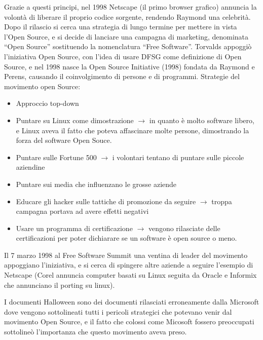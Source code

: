 Grazie a questi principi, nel 1998 Netscape (il primo browser grafico) annuncia la volont\`a di liberare il proprio codice sorgente, rendendo Raymond una celebrit\`a. Dopo il rilascio si cerca una strategia di lungo termine per mettere in vista l'Open Source, e si decide di lanciare una campagna di marketing, denominata ``Open Source'' sostituendo la nomenclatura ``Free Software''. Torvalds appoggi\`o l'iniziativa Open Source, con l'idea di usare DFSG come definizione di Open Source, e nel 1998 nasce la Open Source Initiative (1998) fondata da Raymond e Perens, causando il coinvolgimento di persone e di programmi. Strategie del movimento open Source:
\begin{itemize}

\item Approccio top-down
\item Puntare su Linux come dimostrazione $\to$ in quanto \`e molto software libero, e Linux aveva il fatto che poteva affascinare molte persone, dimostrando la forza del software Open Souce.
\item Puntare sulle Fortune 500 $\to$ i volontari tentano di puntare sulle piccole aziendine
\item Puntare sui media che influenzano le grosse aziende
\item Educare gli hacker sulle tattiche di promozione da seguire $\to$ troppa campagna portava ad avere effetti negativi
\item Usare un programma di certificazione $\to$ vengono rilasciate delle certificazioni per poter dichiarare se un software \`e open source o meno.

\end{itemize}

Il 7 marzo 1998 al Free Software Summit una ventina di leader del movimento appoggiano l'iniziativa, e si cerca di spingere altre aziende a seguire l'esempio di Netscape (Corel annuncia computer basati su Linux seguita da Oracle e Informix che annunciano il porting su linux).

I documenti Halloween sono dei documenti rilasciati erroneamente dalla Microsoft dove vengono sottolineati tutti i pericoli strategici che potevano venir dal movimento Open Source, e il fatto che colossi come Micosoft fossero preoccupati sottoline\`o l'importanza che questo movimento aveva preso.

